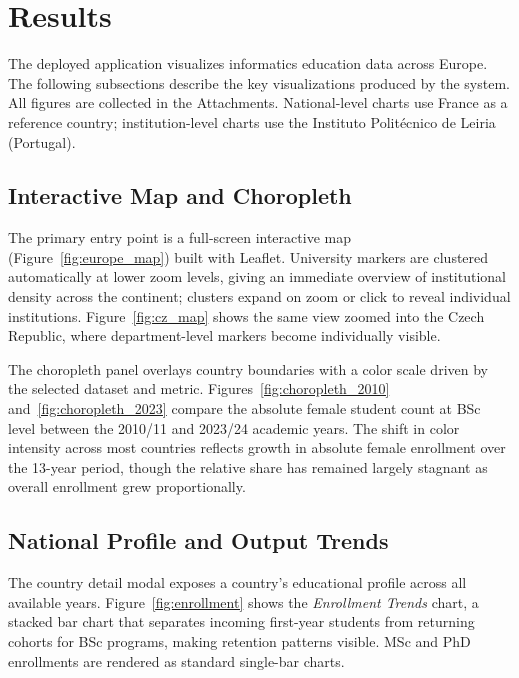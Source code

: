 \documentclass[final,3p,times,twocolumn]{elsarticle}
\begin{document}
\section{Results}
\label{sec:results}

The deployed application visualizes informatics education data across Europe. The following subsections describe the key visualizations produced by the system. All figures are collected in the Attachments. National-level charts use France as a reference country; institution-level charts use the Instituto Polit\'{e}cnico de Leiria (Portugal).

\subsection{Interactive Map and Choropleth}

The primary entry point is a full-screen interactive map (Figure~\ref{fig:europe_map}) built with Leaflet. University markers are clustered automatically at lower zoom levels, giving an immediate overview of institutional density across the continent; clusters expand on zoom or click to reveal individual institutions. Figure~\ref{fig:cz_map} shows the same view zoomed into the Czech Republic, where department-level markers become individually visible.

The choropleth panel overlays country boundaries with a color scale driven by the selected dataset and metric. Figures~\ref{fig:choropleth_2010} and~\ref{fig:choropleth_2023} compare the absolute female student count at BSc level between the 2010/11 and 2023/24 academic years. The shift in color intensity across most countries reflects growth in absolute female enrollment over the 13-year period, though the relative share has remained largely stagnant as overall enrollment grew proportionally.

\subsection{National Profile and Output Trends}

The country detail modal exposes a country's educational profile across all available years. Figure~\ref{fig:enrollment} shows the \textit{Enrollment Trends} chart, a stacked bar chart that separates incoming first-year students from returning cohorts for BSc programs, making retention patterns visible. MSc and PhD enrollments are rendered as standard single-bar charts.
\end{document}
